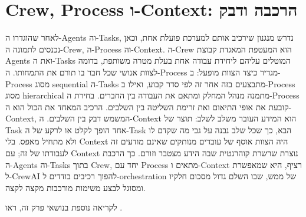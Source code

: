 \section{Crew, Process ו-Context: הרכבה ודבק}
לאחר שהוגדרו ה-Agents וה-Tasks, נדרש מנגנון שירכיב אותם למערכת פועלת אחת, וכאן נכנסים לתמונה ה-Crew, ה-Process וה-Context. ה-Crew הוא המעטפת המאגדת קבוצת Agents ואת ה-Tasks המוטלים עליהם ליחידת עבודה אחת בעלת מטרה משותפת, בדומה לצוות אנושי שכל חבר בו תורם את התמחותו. ה-Process מגדיר כיצד הצוות מופעל: ב-Process מסוג sequential ה-Tasks מתבצעים בזה אחר זה לפי סדר קבוע, ואילו ב-Process מסוג hierarchical מתמנה מנהל המחלק ומתאם את העבודה בין החברים. בחירת ה-Process קובעת את אופי התיאום ואת זרימת השליטה בין השלבים. הרכיב המאחד את הכול הוא ה-Context, המשמש דבק בין השלבים. ה-Context הוא המידע העובר משלב לשלב: תוצר של Task אחד הופך לקלט או לרקע של ה-Task הבא, כך שכל שלב נבנה על גבי מה שקדם לו ולא מתחיל מאפס. בלי Context היה הצוות אוסף של עובדים מנותקים שאינם מודעים זה לעבודתו של זה; עם Context נוצרת שרשרת קוהרנטית שבה הידע מצטבר וזורם. כך הרכבת ה-Agents וה-Tasks בתוך Crew, יחד עם Process מתאים ו-Context רציף, היא שמאפשרת ל-CrewAI להפוך רכיבים בודדים ל-orchestration של ממש, שבו השלם גדול מסכום חלקיו ומסוגל לבצע משימות מורכבות מקצה לקצה.

לקריאה נוספת בנושאי פרק זה, ראו \cite{langchain_docs}.

